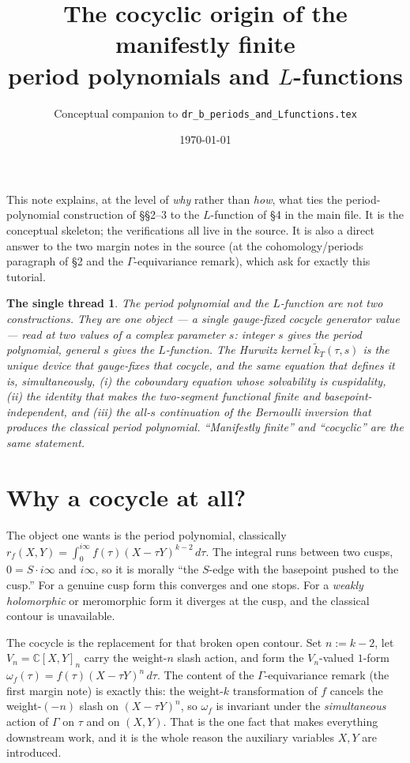 \documentclass[11pt]{article}
\title{\bf The cocyclic origin of the manifestly finite\\ period polynomials and $L$-functions}
\author{Conceptual companion to \texttt{dr\_b\_periods\_and\_Lfunctions.tex}}
\date{\today}
\newcommand{\CC}{\mathbb{C}}
\newcommand{\ktil}{\widetilde{k}_T}
\theoremstyle{plain}
\newtheorem*{claim}{The single thread}
\begin{document}
\maketitle

\noindent
This note explains, at the level of \emph{why} rather than \emph{how}, what
ties the period-polynomial construction of \S\S2--3 to the $L$-function of
\S4 in the main file. It is the conceptual skeleton; the verifications all
live in the source. It is also a direct answer to the two margin notes in
the source (at the cohomology/periods paragraph of \S2 and the
$\Gamma$-equivariance remark), which ask for exactly this tutorial.

\begin{claim}
The period polynomial and the $L$-function are not two constructions. They
are one object --- a single \emph{gauge-fixed cocycle generator value} ---
read at two values of a complex parameter $s$: integer $s$ gives the period
polynomial, general $s$ gives the $L$-function. The Hurwitz kernel
$\ktil(\tau,s)$ is the unique device that gauge-fixes that cocycle, and the
\emph{same} equation that defines it is, simultaneously, (i) the
coboundary equation whose solvability is cuspidality, (ii) the identity
that makes the two-segment functional finite and basepoint-independent, and
(iii) the all-$s$ continuation of the Bernoulli inversion that produces the
classical period polynomial. ``Manifestly finite'' and ``cocyclic'' are the
same statement.
\end{claim}

\section{Why a cocycle at all?}

The object one wants is the period polynomial, classically
$r_f(X,Y)=\int_0^{i\infty} f(\tau)(X-\tau Y)^{k-2}\,d\tau$. The integral
runs between two cusps, $0 = S\!\cdot\! i\infty$ and $i\infty$, so it is
morally ``the $S$-edge with the basepoint pushed to the cusp.'' For a
genuine cusp form this converges and one stops. For a \emph{weakly
holomorphic} or meromorphic form it diverges at the cusp, and the classical
contour is unavailable.

The cocycle is the replacement for that broken open contour. Set
$n:=k-2$, let $V_n=\CC[X,Y]_n$ carry the weight-$n$ slash action, and form
the $V_n$-valued $1$-form $\omega_f(\tau)=f(\tau)(X-\tau Y)^n\,d\tau$. The
content of the $\Gamma$-equivariance remark (the first margin note) is
exactly this: the weight-$k$ transformation of $f$ cancels the
weight-$(-n)$ slash on $(X-\tau Y)^n$, so $\omega_f$ is invariant under the
\emph{simultaneous} action of $\Gamma$ on $\tau$ and on $(X,Y)$. That is the
one fact that makes everything downstream work, and it is the whole reason
the auxiliary variables $X,Y$ are introduced.
\end{document}

